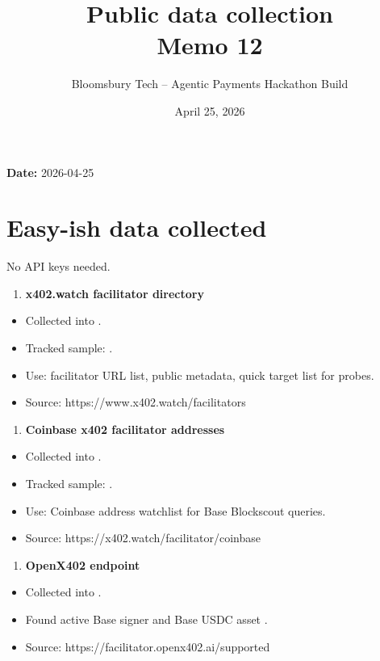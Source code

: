 \documentclass[11pt]{article}
\title{\textbf{Public data collection}\\
\large Memo 12}
\author{Bloomsbury Tech -- Agentic Payments Hackathon Build}
\date{April 25, 2026}
\begin{document}
\maketitle

\textbf{Date:} 2026-04-25

\section{Easy-ish data collected}
No API keys needed.

\begin{enumerate}
  \item \textbf{x402.watch facilitator directory}
\end{enumerate}
\begin{itemize}
  \item Collected into .
  \item Tracked sample: .
  \item Use: facilitator URL list, public metadata, quick target list for  probes.
  \item Source: https://www.x402.watch/facilitators
\end{itemize}
\begin{enumerate}
  \item \textbf{Coinbase x402 facilitator addresses}
\end{enumerate}
\begin{itemize}
  \item Collected into .
  \item Tracked sample: .
  \item Use: Coinbase address watchlist for Base Blockscout queries.
  \item Source: https://x402.watch/facilitator/coinbase
\end{itemize}
\begin{enumerate}
  \item \textbf{OpenX402  endpoint}
\end{enumerate}
\begin{itemize}
  \item Collected into .
  \item Found active Base signer  and Base USDC asset .
  \item Source: https://facilitator.openx402.ai/supported
\end{itemize}
\end{document}
